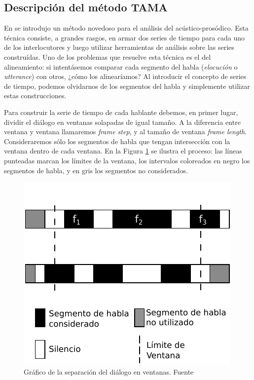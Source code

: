 \subsection{Descripción del método TAMA}
\label{sec:ant_tama}

En \cite{KOU2008} se introdujo un método novedoso para el análisis del \entrainment acústico-prosódico. Esta técnica consiste, a grandes rasgos, en armar dos series de tiempo para cada uno de los interlocutores y luego utilizar herramientas de análisis sobre las series construídas. Uno de los problemas que resuelve esta técnica es el del alineamiento: si intentásemos comparar cada segmento del habla (\emph{elocución} o \emph{utterance}) con otros, ¿cómo los alinearíamos? Al introducir el concepto de series de tiempo, podemos olvidarnos de los segmentos del habla y simplemente utilizar estas construcciones.

Para construir la serie de tiempo de cada hablante debemos, en primer lugar, dividir el diálogo en ventanas solapadas de igual tamaño. A la diferencia entre ventana y ventana llamaremos \emph{frame step}, y al tamaño de ventana \emph{frame length}. Consideraremos sólo los segmentos de habla que tengan intersección con la ventana dentro de cada ventana. En la Figura \ref{tama} se ilustra el proceso: las líneas punteadas marcan los límites de la ventana, los intervalos coloreados en negro los segmentos de habla, y en gris los segmentos no considerados.

\begin{figure}[t]
\centering
  \includegraphics[scale=0.85]{images/tama_improved.pdf}
\caption{Gráfico de la separación del diálogo en ventanas. Fuente \cite{KOU2008.2}}
\label{tama}
\end{figure}

